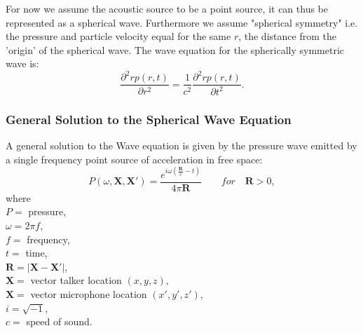 For now we assume the acoustic source to be a point source, it can thus be represented as a spherical wave. Furthermore we assume "spherical symmetry" i.e. the pressure and particle velocity equal for the same $r$, the distance from the 'origin' of the spherical wave. The wave equation for the spherically symmetric wave is\cite{Waves2004}:
\begin{equation}
    \frac{\partial^2rp(r,t)}{\partial r^2} = \frac{1}{c^2}\frac{\partial^2rp(r,t)}{\partial t^2}.
\end{equation}
\subsubsection{General Solution to the Spherical Wave Equation}
A general solution to the Wave equation is given by the pressure wave emitted by a single frequency point source of acceleration in free space\cite{Allen1979}:
\begin{equation}
    P(\omega,\mathbf{X},\mathbf{X'}) = \frac{e^{i\omega(\frac{\mathbf{R}}{c}-t)}}{4\pi \mathbf{R}}\quad\quad for\quad\mathbf{R}>0,
\end{equation}
where\\
$P=$ pressure,\\
$\omega=2\pi f$,\\
$f=$ frequency,\\
$t=$ time,\\
$\mathbf{R}=|\mathbf{X}-\mathbf{X}'|$,\\
$\mathbf{X}=$ vector talker location $(x,y,z)$,\\
$\mathbf{X}=$ vector microphone location $(x',y',z')$,\\
$i=\sqrt{-1}$,\\
$c=$ speed of sound.
\\
\\

    

